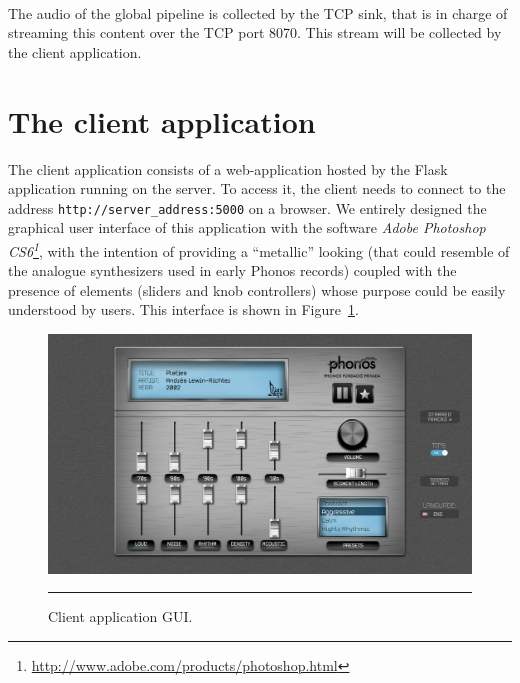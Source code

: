 \\The audio of the global pipeline is collected by the TCP sink, that is in charge of streaming this content over the TCP port 8070. This stream will be collected by the client application.



\section{The client application}
\label{sec:rtclient}
The client application consists of a web-application hosted by the Flask application running on the server. To access it, the client needs to connect to the address \texttt{http://server\_address:5000} on a browser. We entirely designed the graphical user interface of this application with the software \textit{Adobe Photoshop CS6\footnote{\url{http://www.adobe.com/products/photoshop.html}}}, with the intention of providing a ``metallic'' looking (that could resemble of the analogue synthesizers used in early Phonos records) coupled with the presence of elements (sliders and knob controllers) whose purpose could be easily understood by users. This interface is shown in Figure~\ref{fig:gui1}.

\begin{figure}[h]
\hskip -0.8cm
\includegraphics[scale=0.34]{Figures/gui1.png}
    \rule{27em}{0.5pt}
  \caption[Client application user interface]{Client application GUI.}
  \label{fig:gui1}

\end{figure}

